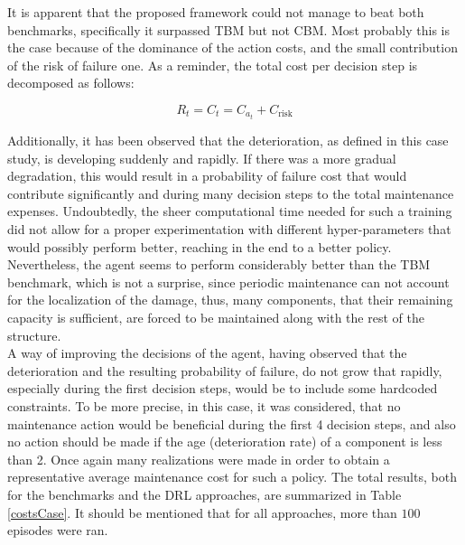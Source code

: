 It is apparent that the proposed framework could not manage to beat both benchmarks, specifically it surpassed \gls{TBM} but not \gls{CBM}. Most probably this is the case because of the dominance of the action costs, and the small contribution of the risk of failure one. As a reminder, the total cost per decision step is decomposed as follows:

$$ R_t = C_t = C_{a_t} + C_{\text{risk}}$$

Additionally, it has been observed that the deterioration, as defined in this case study, is developing suddenly and rapidly. If there was a more gradual degradation, this would result in a probability of failure cost that would contribute significantly and during many decision steps to the total maintenance expenses. Undoubtedly, the sheer computational time needed for such a training did not allow for a proper experimentation with different hyper-parameters that would possibly perform better, reaching in the end to a better policy. Nevertheless, the agent seems to perform considerably better than the \gls{TBM} benchmark, which is not a surprise, since periodic maintenance can not account for the localization of the damage, thus, many components, that their remaining capacity is sufficient, are forced to be maintained along with the rest of the structure.\\

A way of improving the decisions of the agent, having observed that the deterioration and the resulting probability of failure, do not grow that rapidly, especially during the first decision steps, would be to include some hardcoded constraints. To be more precise, in this case, it was considered, that no maintenance action would be beneficial during the first 4 decision steps, and also no action should be made if the age (deterioration rate) of a component is less than 2. Once again many realizations were made in order to obtain a representative average maintenance cost for such a policy. The total results, both for the benchmarks and the \gls{DRL} approaches, are summarized in Table \ref{costsCase}. It should be mentioned that for all approaches, more than $100$ episodes were ran.

